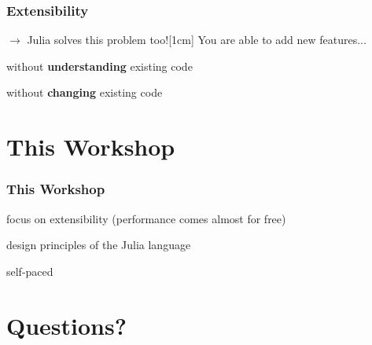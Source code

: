 \documentclass[notes]{beamer}
\def\\{}%
\newenvironment{wideitemize}{
    \itemize\addtolength{\itemsep}{15pt}\addtolength{\topsep}{10pt}}{\enditemize}
\begin{document}
    \begin{frame}
        \frametitle{Extensibility}
        $\rightarrow$ Julia solves this problem too!\\[1cm]
        You are able to add new features...
        \vspace{0.8cm}
        \begin{wideitemize}
            \item<1-> without \textbf{understanding} existing code
            \item<2-> without \textbf{changing} existing code
        \end{wideitemize}
    \end{frame}

	\section{This Workshop}

    \begin{frame}
        \frametitle{This Workshop}
        \begin{wideitemize}
            \item focus on extensibility (performance comes almost for free)
            \item design principles of the Julia language
            \item self-paced
        \end{wideitemize}
    \end{frame}

    \section{Questions?}
\end{document}
